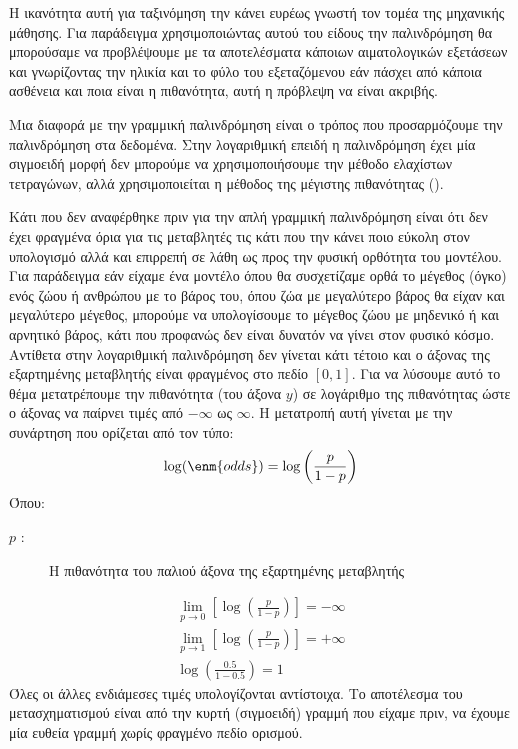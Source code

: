 Η ικανότητα αυτή για ταξινόμηση την κάνει ευρέως γνωστή τον τομέα της μηχανικής
μάθησης. Για παράδειγμα χρησιμοποιώντας αυτού του είδους την παλινδρόμηση θα
μπορούσαμε να προβλέψουμε με τα αποτελέσματα κάποιων αιματολογικών εξετάσεων και
γνωρίζοντας την ηλικία και το φύλο του εξεταζόμενου εάν πάσχει από κάποια ασθένεια και
ποια είναι η πιθανότητα, αυτή η πρόβλεψη να είναι ακριβής.

Μια διαφορά με την
γραμμική παλινδρόμηση είναι ο τρόπος που προσαρμόζουμε την παλινδρόμηση στα
δεδομένα. Στην λογαριθμική επειδή η παλινδρόμηση έχει μία σιγμοειδή μορφή δεν
μπορούμε να χρησιμοποιήσουμε την μέθοδο ελαχίστων τετραγώνων, αλλά χρησιμοποιείται
η μέθοδος της μέγιστης πιθανότητας ().

Κάτι που δεν αναφέρθηκε πριν για την απλή γραμμική παλινδρόμηση είναι ότι δεν έχει
φραγμένα όρια για τις μεταβλητές τις κάτι που την κάνει ποιο εύκολη στον υπολογισμό αλλά
και επιρρεπή σε λάθη ως προς την φυσική ορθότητα του μοντέλου. Για παράδειγμα εάν
είχαμε ένα μοντέλο όπου θα συσχετίζαμε ορθά το μέγεθος (όγκο) ενός ζώου ή ανθρώπου με
το βάρος του, όπου ζώα με μεγαλύτερο βάρος θα είχαν και μεγαλύτερο μέγεθος, μπορούμε
να υπολογίσουμε το μέγεθος ζώου με μηδενικό ή και αρνητικό βάρος, κάτι που προφανώς
δεν είναι δυνατόν να γίνει στον φυσικό κόσμο. Αντίθετα στην λογαριθμική παλινδρόμηση δεν
γίνεται κάτι τέτοιο και ο άξονας της εξαρτημένης μεταβλητής είναι φραγμένος στο πεδίο $[0,1]$.
Για να λύσουμε αυτό το θέμα μετατρέπουμε την πιθανότητα (του άξονα $y$) σε λογάριθμο της
πιθανότητας ώστε ο άξονας να παίρνει τιμές από $-\infty$ ως $\infty$. Η μετατροπή αυτή γίνεται με
την συνάρτηση  που ορίζεται από τον τύπο:
$$\log(\enm{odds})=\log\left(\frac{p}{1-p}\right)$$
Όπου:
\begin{description}
    \item[$p$ :] Η πιθανότητα του παλιού άξονα της εξαρτημένης μεταβλητής
\end{description}
\begin{gather*}
    \lim\limits_{p\rightarrow0}\left[\log\left(\frac{p}{1-p}\right)\right]=-\infty \\
    \lim\limits_{p\rightarrow1}\left[\log\left(\frac{p}{1-p}\right)\right]=+\infty \\
    \log\left(\frac{0.5}{1-0.5}\right)=1
\end{gather*}
Όλες οι άλλες ενδιάμεσες τιμές υπολογίζονται αντίστοιχα. Το αποτέλεσμα του
μετασχηματισμού είναι από την κυρτή (σιγμοειδή) γραμμή που είχαμε πριν, να έχουμε μία
ευθεία γραμμή χωρίς φραγμένο πεδίο ορισμού.

